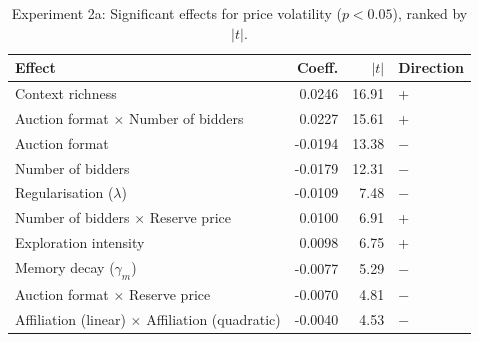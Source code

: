 \begin{table}[H]
\centering
\caption{Experiment 2a: Significant effects for price volatility ($p < 0.05$), ranked by $|t|$.}
\label{tab:exp2a_ranked_vol}
\begin{tabular}{lrrl}
\toprule
\textbf{Effect} & \textbf{Coeff.} & \textbf{$|t|$} & \textbf{Direction} \\
\midrule
Context richness & 0.0246 & 16.91 & + \\
Auction format $\times$ Number of bidders & 0.0227 & 15.61 & + \\
Auction format & -0.0194 & 13.38 & $-$ \\
Number of bidders & -0.0179 & 12.31 & $-$ \\
Regularisation ($\lambda$) & -0.0109 & 7.48 & $-$ \\
Number of bidders $\times$ Reserve price & 0.0100 & 6.91 & + \\
Exploration intensity & 0.0098 & 6.75 & + \\
Memory decay ($\gamma_m$) & -0.0077 & 5.29 & $-$ \\
Auction format $\times$ Reserve price & -0.0070 & 4.81 & $-$ \\
Affiliation (linear) $\times$ Affiliation (quadratic) & -0.0040 & 4.53 & $-$ \\
\bottomrule
\end{tabular}
\end{table}
